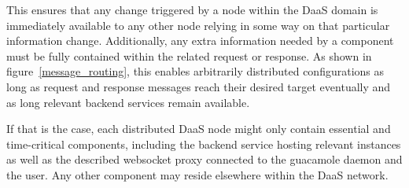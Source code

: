 \documentclass[runningheads]{llncs}
\begin{document}
This ensures that any change triggered by a node within the DaaS domain
is immediately available to any other node relying in some way
on that particular information change.
Additionally, any extra information needed by a component must be fully contained
within the related request or response.
As shown in figure~\ref{message_routing}, this enables arbitrarily distributed configurations as long as request
and response messages reach their desired target eventually
and as long relevant backend services remain available.

If that is the case, each distributed DaaS node might only contain essential and time-critical components,
including the backend service hosting relevant instances as well as the described
websocket proxy connected to the guacamole daemon and the user.
Any other component may reside elsewhere within the DaaS network.
\end{document}
